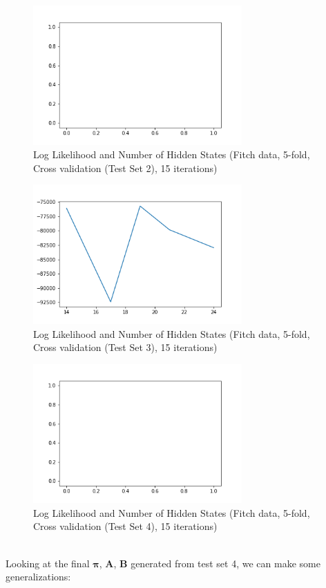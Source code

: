 \documentclass[a4paper, 11pt]{article}
\begin{document}
\begin{figure}[!h]
	\caption{Log Likelihood and Number of Hidden States (Fitch data, 5-fold, Cross validation (Test Set 2), 15 iterations)}
	\includegraphics[width=8cm]{Cross_validation_test_2.png}
\end{figure}
\begin{figure}[!h]
	\caption{Log Likelihood and Number of Hidden States (Fitch data, 5-fold, Cross validation (Test Set 3), 15 iterations)}
	\includegraphics[width=8cm]{Cross_validation_test_3.png}
\end{figure}
\begin{figure}[h]
	\caption{Log Likelihood and Number of Hidden States (Fitch data, 5-fold, Cross validation (Test Set 4), 15 iterations)}
	\includegraphics[width=8cm]{Cross_validation_test_4.png}
\end{figure}
\\
Looking at the final  $\mathbf{\pi}$, $\mathbf{A}$, $\mathbf{B}$ generated from test set 4, we can make some generalizations:
\end{document}
